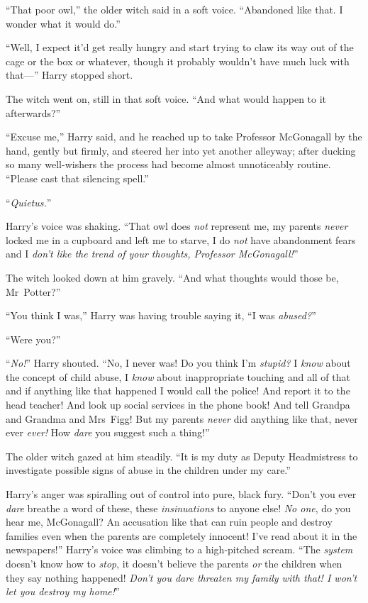 “That poor owl,” the older witch said in a soft voice. “Abandoned like that. I wonder what it would do.”

“Well, I expect it’d get really hungry and start trying to claw its way out of the cage or the box or whatever, though it probably wouldn’t have much luck with that—” Harry stopped short.

The witch went on, still in that soft voice. “And what would happen to it afterwards?”

“Excuse me,” Harry said, and he reached up to take Professor McGonagall by the hand, gently but firmly, and steered her into yet another alleyway; after ducking so many well-wishers the process had become almost unnoticeably routine. “Please cast that silencing spell.”

“\emph{Quietus.}”

Harry’s voice was shaking. “That owl does \emph{not} represent me, my parents \emph{never} locked me in a cupboard and left me to starve, I do \emph{not} have abandonment fears and I \emph{don’t like the trend of your thoughts, Professor McGonagall!}”

The witch looked down at him gravely. “And what thoughts would those be, Mr~Potter?”

“You think I was,” Harry was having trouble saying it, “I was \emph{abused?}”

“Were you?”

“\emph{No!}” Harry shouted. “No, I never was! Do you think I’m \emph{stupid?} I \emph{know} about the concept of child abuse, I \emph{know} about inappropriate touching and all of that and if anything like that happened I would call the police! And report it to the head teacher! And look up social services in the phone book! And tell Grandpa and Grandma and Mrs~Figg! But my parents \emph{never} did anything like that, never ever \emph{ever!} How \emph{dare} you suggest such a thing!”

The older witch gazed at him steadily. “It is my duty as Deputy Headmistress to investigate possible signs of abuse in the children under my care.”

Harry’s anger was spiralling out of control into pure, black fury. “Don’t you ever \emph{dare} breathe a word of these, these \emph{insinuations} to anyone else! \emph{No one}, do you hear me, McGonagall? An accusation like that can ruin people and destroy families even when the parents are completely innocent! I’ve read about it in the newspapers!” Harry’s voice was climbing to a high-pitched scream. “The \emph{system} doesn’t know how to \emph{stop}, it doesn’t believe the parents \emph{or} the children when they say nothing happened! \emph{Don’t you dare threaten my family with that! I won’t let you destroy my home!}”

